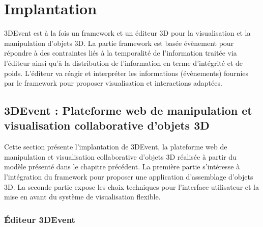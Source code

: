 
\chapter{Implantation}
\chaptertable

3DEvent est à la fois un \gls{framework} et un éditeur 3D pour la visualisation et la 
manipulation d'objets 3D. La partie \gls{framework} est basée évènement pour 
répondre à des contraintes liés à la temporalité de l'information traitée via l'éditeur 
ainsi qu'à la distribution de l'information en terme d'intégrité et de poids. L'éditeur 
va réagir et interpréter les informations (évènements) fournies par le 
\gls{framework} pour proposer visualisation et interactions adaptées.

\section{3DEvent : Plateforme web de manipulation et visualisation 
	collaborative 
	d'objets 3D}

Cette section présente l'implantation de 3DEvent, la plateforme web de 
manipulation et visualisation collaborative d'objets 3D réalisée à partir du modèle 
présenté dans le chapitre précédent. La première partie s'intéresse à l'intégration 
du framework pour proposer une application d'assemblage d'objets 3D. La seconde 
partie expose les choix techniques pour l'interface utilisateur et la mise en avant 
du système de visualisation flexible.
\subsection{Éditeur 3DEvent}


